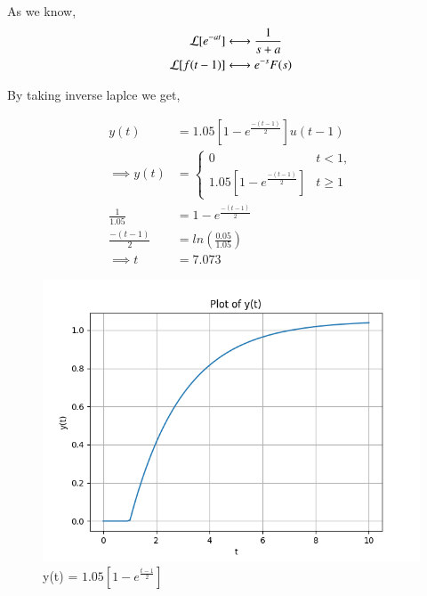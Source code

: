 \documentclass[journal,12pt,twocolumn]{IEEEtran}
\theoremstyle{remark}
\begin{document}
As we know,
\begin{align}
    \mathcal{L}[e^{-at}] &\system{} \frac{1}{s+a} \\
    \mathcal{L}[f(t-1)] &\system{} e^{-s}F(s)
\end{align}

By taking inverse laplce we get,

\begin{align}
    y(t) &= 1.05[1-e^{\frac{-(t-1)}{2}}]u(t-1) \\
    \implies y(t) &= \begin{cases}
        0 & t < 1, \\
        1.05[1-e^{\frac{-(t-1)}{2}}] & t \geq 1
    \end{cases} \\
    \frac{1}{1.05} &= 1-e^{\frac{-(t-1)}{2}} \\
    \frac{-(t-1)}{2} &= ln(\frac{0.05}{1.05}) \\
    \implies t &= 7.073 
\end{align}

\begin{figure}[h]
    \centering
    \includegraphics[width=\columnwidth]{figs/fig1.png}
    \caption{y(t) = $1.05[1-e^{\frac{t-1}{2}}]$}
    \label{fig:gate23ch62}
\end{figure}
\end{document}
